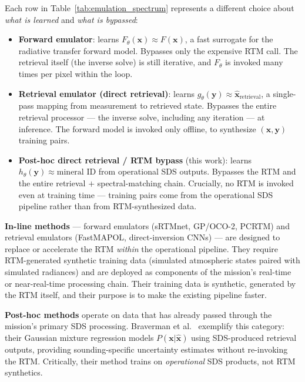 \documentclass[11pt]{report}
\begin{document}
Each row in Table~\ref{tab:emulation_spectrum} represents a different choice about \emph{what is learned} and \emph{what is bypassed}:
\begin{itemize}
  \item \textbf{Forward emulator}: learns $F_{\theta}(\mathbf{x}) \approx F(\mathbf{x})$, a fast surrogate for the radiative transfer forward model. Bypasses only the expensive RTM call. The retrieval itself (the inverse solve) is still iterative, and $F_{\theta}$ is invoked many times per pixel within the loop.
  \item \textbf{Retrieval emulator (direct retrieval)}: learns $g_{\theta}(\mathbf{y}) \approx \hat{\mathbf{x}}_{\text{retrieval}}$, a single-pass mapping from measurement to retrieved state. Bypasses the entire retrieval processor --- the inverse solve, including any iteration --- at inference. The forward model is invoked only offline, to synthesize $(\mathbf{x}, \mathbf{y})$ training pairs.
  \item \textbf{Post-hoc direct retrieval / RTM bypass} (this work): learns $h_{\theta}(\mathbf{y}) \approx \text{mineral~ID}$ from operational SDS outputs. Bypasses the RTM and the entire retrieval $+$ spectral-matching chain. Crucially, no RTM is invoked even at training time --- training pairs come from the operational SDS pipeline rather than from RTM-synthesized data.
\end{itemize}

\textbf{In-line methods} --- forward emulators (sRTMnet, GP/OCO-2, PCRTM) and retrieval emulators (FastMAPOL, direct-inversion CNNs) --- are designed to replace or accelerate the RTM \emph{within} the operational pipeline. They require RTM-generated synthetic training data (simulated atmospheric states paired with simulated radiances) and are deployed as components of the mission's real-time or near-real-time processing chain. Their training data is synthetic, generated by the RTM itself, and their purpose is to make the existing pipeline faster.

\textbf{Post-hoc methods} operate on data that has already passed through the mission's primary SDS processing. Braverman et al.\ \cite{braverman2021} exemplify this category: their Gaussian mixture regression models $P(\mathbf{x}|\hat{\mathbf{x}})$ using SDS-produced retrieval outputs, providing sounding-specific uncertainty estimates without re-invoking the RTM. Critically, their method trains on \emph{operational} SDS products, not RTM synthetics.
\end{document}
